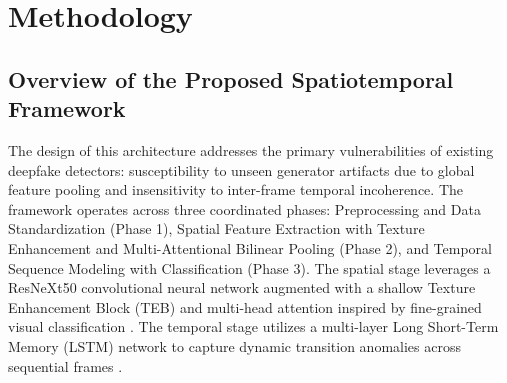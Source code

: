 \section{Methodology}
\label{sec:methodology}

\subsection{Overview of the Proposed Spatiotemporal Framework}
The design of this architecture addresses the primary vulnerabilities of existing deepfake detectors: susceptibility to unseen generator artifacts due to global feature pooling and insensitivity to inter-frame temporal incoherence. The framework operates across three coordinated phases: Preprocessing and Data Standardization (Phase 1), Spatial Feature Extraction with Texture Enhancement and Multi-Attentional Bilinear Pooling (Phase 2), and Temporal Sequence Modeling with Classification (Phase 3). The spatial stage leverages a ResNeXt50 convolutional neural network augmented with a shallow Texture Enhancement Block (TEB) and multi-head attention inspired by fine-grained visual classification \citep{Zhao2021MultiAttentional}. The temporal stage utilizes a multi-layer Long Short-Term Memory (LSTM) network to capture dynamic transition anomalies across sequential frames \citep{Jugade2026SpatialTemporal}.

